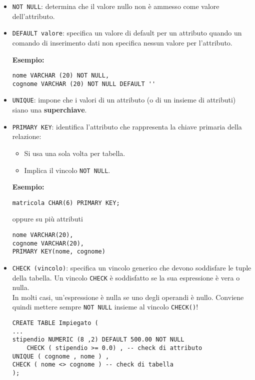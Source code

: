 \documentclass[a4paper, 10pt, titlepage]{article}
\begin{document}
	\begin{itemize}
		\item \lstinline|NOT NULL|: determina che il valore nullo non è ammesso come
		valore dell’attributo.
		\item \lstinline|DEFAULT valore|: specifica un valore di
		default per un attributo quando un comando di inserimento dati non specifica nessun valore per l’attributo.
		
	\textbf{Esempio:}
	\begin{lstlisting}
nome VARCHAR (20) NOT NULL,
cognome VARCHAR (20) NOT NULL DEFAULT ''
	\end{lstlisting}
		\item \lstinline|UNIQUE|: impone che i valori di un attributo (o di un insieme di
		attributi) siano una \textbf{superchiave}.
		\item \lstinline|PRIMARY KEY|: identifica l’attributo che rappresenta la chiave
		primaria della relazione:
		\begin{itemize}
			\item Si usa una sola volta per tabella.
			\item Implica il vincolo \lstinline|NOT NULL|.
		\end{itemize}
	
	\textbf{Esempio: }
	\begin{lstlisting}
matricola CHAR(6) PRIMARY KEY;
	\end{lstlisting}
	oppure su più attributi
	\begin{lstlisting}
nome VARCHAR(20),
cognome VARCHAR(20),
PRIMARY KEY(nome, cognome)
	\end{lstlisting}
	
	\item \lstinline|CHECK (vincolo)|: specifica un vincolo generico che devono soddisfare le tuple della tabella.
	Un vincolo \lstinline|CHECK| è soddisfatto se la sua espressione è vera o nulla. \\
In molti casi, un’espressione è nulla se uno degli operandi è nullo. Conviene quindi mettere sempre \lstinline|NOT NULL| insieme al vincolo \lstinline|CHECK()|!
	\begin{lstlisting}
CREATE TABLE Impiegato (
...
stipendio NUMERIC (8 ,2) DEFAULT 500.00 NOT NULL
	CHECK ( stipendio >= 0.0) , -- check di attributo
UNIQUE ( cognome , nome ) ,
CHECK ( nome <> cognome ) -- check di tabella
);
	\end{lstlisting}
	
	\end{itemize}
	
\end{document}
